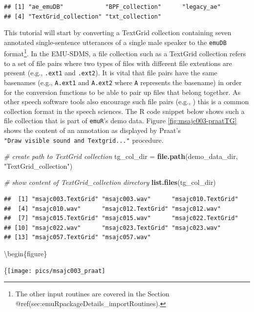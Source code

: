 \documentclass[]{book}
\newenvironment{Shaded}{\begin{snugshade}}{\end{snugshade}}
\newcommand{\CommentTok}[1]{\textcolor[rgb]{0.56,0.35,0.01}{\textit{#1}}}
\newcommand{\KeywordTok}[1]{\textcolor[rgb]{0.13,0.29,0.53}{\textbf{#1}}}
\newcommand{\NormalTok}[1]{#1}
\newcommand{\StringTok}[1]{\textcolor[rgb]{0.31,0.60,0.02}{#1}}
\begin{document}
\begin{verbatim}
## [1] "ae_emuDB"            "BPF_collection"      "legacy_ae"          
## [4] "TextGrid_collection" "txt_collection"
\end{verbatim}

This tutorial will start by converting a TextGrid collection containing seven annotated single-sentence utterances of a single male speaker to the \texttt{emuDB} format\footnote{The other input routines are covered in the Section @ref(sec:emuRpackageDetails\_importRoutines).}. In the EMU-SDMS, a file collection such as a TextGrid collection refers to a set of file pairs where two types of files with different file extentions are present (e.g., \texttt{.ext1} and \texttt{.ext2}). It is vital that file pairs have the same basenames (e.g., \texttt{A.ext1} and \texttt{A.ext2} where \texttt{A} represents the basename) in order for the conversion functions to be able to pair up files that belong together. As other speech software tools also encourage such file pairs (e.g., \citet{kisler:2015a}) this is a common collection format in the speech sciences. The R code snippet below shows such a file collection that is part of \texttt{emuR}'s demo data. Figure \ref{fig:msajc003-praatTG} shows the content of an annotation as displayed by Praat's \texttt{"Draw\ visible\ sound\ and\ Textgrid..."} procedure.

\begin{Shaded}
\begin{Highlighting}[]
\CommentTok{# create path to TextGrid collection}
\NormalTok{tg_col_dir =}\StringTok{ }\KeywordTok{file.path}\NormalTok{(demo_data_dir, }\StringTok{"TextGrid_collection"}\NormalTok{)}

\CommentTok{# show content of TextGrid_collection directory}
\KeywordTok{list.files}\NormalTok{(tg_col_dir)}
\end{Highlighting}
\end{Shaded}

\begin{verbatim}
##  [1] "msajc003.TextGrid" "msajc003.wav"      "msajc010.TextGrid"
##  [4] "msajc010.wav"      "msajc012.TextGrid" "msajc012.wav"     
##  [7] "msajc015.TextGrid" "msajc015.wav"      "msajc022.TextGrid"
## [10] "msajc022.wav"      "msajc023.TextGrid" "msajc023.wav"     
## [13] "msajc057.TextGrid" "msajc057.wav"
\end{verbatim}

\textbackslash{}begin\{figure\}

\{\centering \texttt{[image: pics/msajc003\_praat]}
\end{document}

